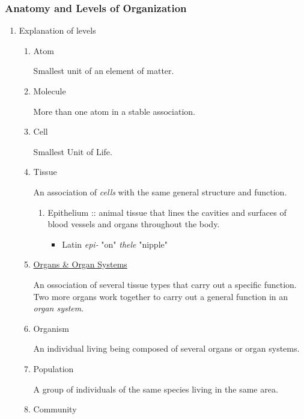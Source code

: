 \documentclass[11pt]{article}
\begin{document}
\subsubsection{Anatomy and Levels of Organization}
\label{sec:org665ad4f}
\begin{enumerate}
\item Explanation of levels
\label{sec:org09079e1}

\begin{enumerate}
\item Atom

Smallest unit of an element of matter.

\item Molecule 

More than one atom in a stable association.

\item Cell

Smallest Unit of Life.

\item Tissue

An association of \emph{cells} with the same general structure and function.

\begin{enumerate}
\item Epithelium :: animal tissue that lines the cavities and surfaces of blood
vessels and organs throughout the body.

\begin{itemize}
\item Latin \emph{epi-} "on" \emph{thele} "nipple"
\end{itemize}
\end{enumerate}

\item \hyperref[sec:org8cc25d2]{Organs \& Organ Systems}

An ossociation of several tissue types that carry out a specific
function. Two more organs work together to carry out a general function
in an \emph{organ system}.

\item Organism 

An individual living being composed of several organs or organ systems.

\item Population

A group of individuals of the same species living in the same area.

\item Community


\end{enumerate}
\end{enumerate}
\end{document}
